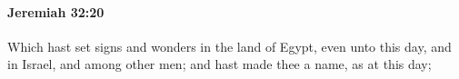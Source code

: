 
		\paragraph{Jeremiah 32:20} %
			\label{JEREMIAH-32-20}

			Which hast set signs and wonders in the land of Egypt, even unto this day, and in Israel, and among other men; and hast made thee a name, as at this day;


